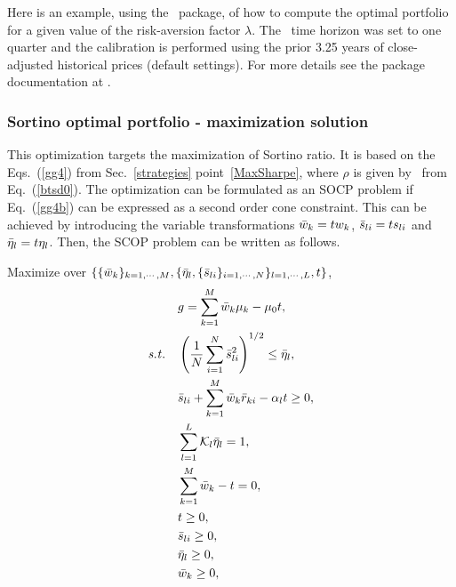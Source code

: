 \bigskip
\noindent Here is an example, using the \azapy\ package, of how to compute the optimal portfolio
for a given value of the risk-aversion factor $\lambda$.
The \mBTSD\ time horizon was set to one quarter and the calibration is performed using the prior 3.25 years of
close-adjusted historical prices (default settings).
For more details see the package documentation at \azapydoc.



\BackToContents


\subsubsection{Sortino optimal portfolio - maximization solution}
This optimization targets the maximization of Sortino ratio. It is based on the
Eqs.~(\ref{gg4}) from Sec.~\ref{strategies} point~\ref{MaxSharpe}, where $\rho$ is given by \mBTSD\ from Eq.~(\ref{btsd0}).
The optimization can be formulated as an SOCP problem
if Eq.\ (\ref{gg4b}) can be expressed as a second order cone constraint. This can be achieved by
introducing the variable transformations ${\bar w}_k = t w_k$, ${\bar s}_{li} = t s_{li}$ and ${\bar \eta}_l = t \eta_l$.
Then, the SCOP problem can be written as follows.

\bigskip
\noindent Maximize over $\{\{{\bar w}_k\}_{k=1,\cdots,M}, \{ {\bar \eta}_l, \{ {\bar s}_{li} \}_{i=1,\cdots,N} \}_{l=1,\cdots,L}, t \}$,
\begin{subequations}\label{btsd8}
\begin{align}
    &g = \sum_{k=1}^M \bw_k \mu_k - \mu_0 t, \label{btsd8a} \\
    \st &\left( \frac{1}{N}  \sum_{i=1}^N \bs_{li}^2 \right)^{1/2} \leq \bbeta_l, \label{btsd8c} \\
    &\bs_{li}  + \sum_{k=1}^M \bw_k \br_{ki} - \alpha_l t \geq 0, \label{btsd8d} \\
    &\sum_{l=1}^L \cK_l \bbeta_l = 1, \label{btsd8b} \\
    &\sum_{k=1}^M \bw_k - t = 0, \label{btsd8e} \\
    &t \geq 0, \label{btsd8h} \\
    &\bs_{li} \geq 0, \label{btsd8g} \\
    &\bbeta_l \geq 0, \label{btsd8i} \\
    &\bw_k \geq 0, \label{btsd8f}
\end{align}
\end{subequations}

